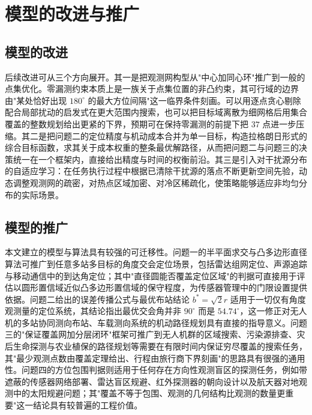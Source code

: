
\section{模型的改进与推广}

\subsection{模型的改进}

后续改进可从三个方向展开。其一是把观测网构型从"中心加同心环"推广到一般的点集优化。零漏测约束本质上是一族关于点集位置的非凸约束，其可行域的边界由"某处恰好出现 $180^\circ$ 的最大方位间隔"这一临界条件刻画。可以用逐点贪心剔除配合局部扰动的启发式在更大范围内搜索，也可以把目标域离散为细网格后用集合覆盖的整数规划给出更紧的下界，预期可在保持零漏测的前提下把 $37$ 点进一步压缩。其二是把问题二的定位精度与机动成本合并为单一目标，构造拉格朗日形式的综合目标函数，求其关于成本权重的整条最优解路径，从而把问题二与问题三的决策统一在一个框架内，直接给出精度与时间的权衡前沿。其三是引入对干扰源分布的自适应学习：在任务执行过程中根据已清除干扰源的落点不断更新空间先验，动态调整观测网的疏密，对热点区域加密、对冷区稀疏化，使策略能够适应非均匀分布的实际场景。

\subsection{模型的推广}

本文建立的模型与算法具有较强的可迁移性。问题一的半平面求交与凸多边形直径算法可推广到任意多站多目标的角度交会定位场景，包括雷达组网定位、声源追踪与移动通信中的到达角定位；其中"直径圆能否覆盖定位区域"的判据可直接用于评估以圆形置信域近似凸多边形置信域的保守程度，为传感器管理中的门限设置提供依据。问题二给出的误差传播公式与最优布站结论 $b^{*}=\sqrt2r$ 适用于一切仅有角度观测量的定位系统，其结论指出最优交会角并非 $90^\circ$ 而是 $54.74^\circ$，这一修正对无人机的多站协同测向布站、车载测向系统的机动路径规划具有直接的指导意义。问题三的"保证覆盖网加分层闭环"框架可推广到无人机群的区域搜索、污染源排查、灾后生命探测与农业植保的路径规划等需要在有限时间内保证穷尽覆盖的搜索任务，其"最少观测点数由覆盖定理给出、行程由旅行商下界刻画"的思路具有很强的通用性。问题四的方位包围判据则适用于任何存在方向性观测盲区的探测任务，例如带遮蔽的传感器网络部署、雷达盲区规避、红外探测器的朝向设计以及航天器对地观测中的太阳规避问题；其"覆盖不等于包围、观测的几何结构比观测的数量更重要"这一结论具有较普遍的工程价值。
